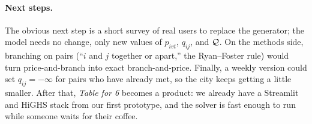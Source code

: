 \paragraph{Next steps.} The obvious next step is a short survey of real users to replace the generator; the model needs no change, only new values of $p_{ivt}$, $q_{ij}$, and $\mathcal{Q}$. On the methods side, branching on pairs (``$i$ and $j$ together or apart,'' the Ryan--Foster rule) would turn price-and-branch into exact branch-and-price. Finally, a weekly version could set $q_{ij}=-\infty$ for pairs who have already met, so the city keeps getting a little smaller. After that, \emph{Table for 6} becomes a product: we already have a Streamlit and HiGHS stack from our first prototype, and the solver is fast enough to run while someone waits for their coffee.
